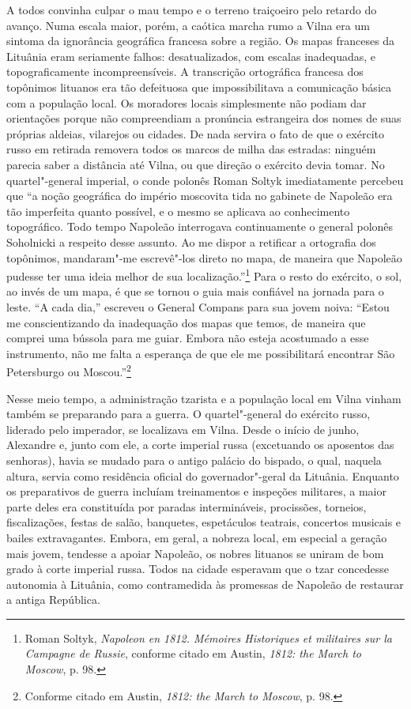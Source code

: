 A todos convinha culpar o mau tempo e o terreno traiçoeiro pelo retardo
do avanço. Numa escala maior, porém, a caótica marcha rumo a Vilna era
um sintoma da ignorância geográfica francesa sobre a região. Os mapas
franceses da Lituânia eram seriamente falhos: desatualizados, com
escalas inadequadas, e topograficamente incompreensíveis. A transcrição
ortográfica francesa dos topônimos lituanos era tão defeituosa que
impossibilitava a comunicação básica com a população local. Os moradores
locais simplesmente não podiam dar orientações porque não compreendiam a
pronúncia estrangeira dos nomes de suas próprias aldeias, vilarejos ou
cidades. De nada servira o fato de que o exército russo em retirada
removera todos os marcos de milha das estradas: ninguém parecia saber a
distância até Vilna, ou que direção o exército devia tomar. No
quartel"-general imperial, o conde polonês Roman Soltyk imediatamente
percebeu que ``a noção geográfica do império moscovita tida no gabinete
de Napoleão era tão imperfeita quanto possível, e o mesmo se aplicava ao
conhecimento topográfico. Todo tempo Napoleão interrogava continuamente
o general polonês Soholnicki a respeito desse assunto. Ao me dispor a
retificar a ortografia dos topônimos, mandaram"-me escrevê"-los direto no
mapa, de maneira que Napoleão pudesse ter uma ideia melhor de sua
localização.''\footnote{Roman Soltyk, \textit{Napoleon en 1812. Mémoires Historiques et militaires sur la Campagne de Russie}, conforme citado em Austin, \textit{1812: the March to Moscow}, p. 98.} Para o resto do exército, o sol, ao invés de um mapa, é que se tornou o guia mais
confiável na jornada para o leste. ``A cada dia,'' escreveu o General
Compans para sua jovem noiva: ``Estou me conscientizando da inadequação
dos mapas que temos, de maneira que comprei uma bússola para me guiar.
Embora não esteja acostumado a esse instrumento, não me falta a
esperança de que ele me possibilitará encontrar São Petersburgo ou
Moscou.''\footnote{Conforme citado em Austin, \textit{1812: the March to Moscow}, p. 98.}

Nesse meio tempo, a administração tzarista e a população local em Vilna
vinham também se preparando para a guerra. O quartel"-general do exército
russo, liderado pelo imperador, se localizava em Vilna. Desde o início
de junho, Alexandre e, junto com ele, a corte imperial russa (excetuando
os aposentos das senhoras), havia se mudado para o antigo palácio do
bispado, o qual, naquela altura, servia como residência oficial do
governador"-geral da Lituânia. Enquanto os preparativos de guerra
incluíam treinamentos e inspeções militares, a maior parte deles era
constituída por paradas intermináveis, procissões, torneios,
fiscalizações, festas de salão, banquetes, espetáculos teatrais,
concertos musicais e bailes extravagantes. Embora, em geral, a nobreza
local, em especial a geração mais jovem, tendesse a apoiar Napoleão, os
nobres lituanos se uniram de bom grado à corte imperial russa. Todos na
cidade esperavam que o tzar concedesse autonomia à Lituânia, como
contramedida às promessas de Napoleão de restaurar a antiga República.

